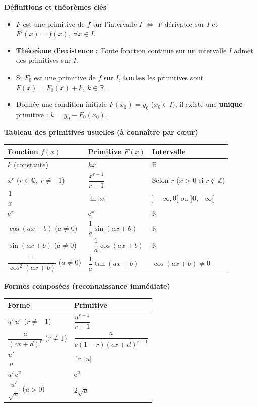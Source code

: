 \documentclass[11pt]{article}
\newcommand{\cle}[1]{{\popxbold\color{popdark}#1}}
\begin{document}
\begin{bilan}

\textbf{Définitions et théorèmes clés}
\begin{itemize}
  \item $F$ est une \cle{primitive} de $f$ sur l'intervalle $I$ $\iff$ $F$ dérivable sur $I$ et $F'(x)=f(x),\ \forall x\in I$.
  \item \textbf{Théorème d'existence :} Toute fonction \cle{continue} sur un intervalle $I$ admet des primitives sur $I$.
  \item Si $F_0$ est une primitive de $f$ sur $I$, \textbf{toutes} les primitives sont $F(x) = F_0(x) + k,\ k\in\mathbb{R}$.
  \item Donnée une condition initiale $F(x_0)=y_0$ ($x_0\in I$), il existe une \textbf{unique} primitive : $k = y_0 - F_0(x_0)$.
\end{itemize}

\textbf{Tableau des primitives usuelles (à connaître par cœur)}
\begin{center}
\begin{tabularx}{\linewidth}{|l|X|l|}\hline
\rowcolor{popblue!40} \textbf{Fonction $f(x)$} & \textbf{Primitive $F(x)$} & \textbf{Intervalle} \\ \hline
$k$ (constante) & $kx$ & $\mathbb{R}$ \\ \hline
$x^r$ \quad ($r\in\mathbb{Q},\ r\neq -1$) & $\dfrac{x^{r+1}}{r+1}$ & Selon $r$ ($x>0$ si $r\notin\mathbb{Z}$) \\ \hline
$\dfrac{1}{x}$ & $\ln|x|$ & $]-\infty,0[$ ou $]0,+\infty[$ \\ \hline
$\mathrm{e}^{x}$ & $\mathrm{e}^{x}$ & $\mathbb{R}$ \\ \hline
$\cos(ax+b)$ \quad ($a\neq 0$) & $\dfrac{1}{a}\sin(ax+b)$ & $\mathbb{R}$ \\ \hline
$\sin(ax+b)$ \quad ($a\neq 0$) & $-\dfrac{1}{a}\cos(ax+b)$ & $\mathbb{R}$ \\ \hline
$\dfrac{1}{\cos^2(ax+b)}$ \quad ($a\neq 0$) & $\dfrac{1}{a}\tan(ax+b)$ & $\cos(ax+b)\neq 0$ \\ \hline
\end{tabularx}
\end{center}

\textbf{Formes composées (reconnaissance immédiate)}
\begin{center}
\begin{tabularx}{\linewidth}{|X|X|}\hline
\rowcolor{popgreen!40} \textbf{Forme} & \textbf{Primitive} \\ \hline
$u'\,u^{r}$ \quad ($r\neq -1$) & $\dfrac{u^{r+1}}{r+1}$ \\ \hline
$\dfrac{a}{(cx+d)^r}$ \quad ($r\neq 1$) & $\dfrac{a}{c(1-r)(cx+d)^{r-1}}$ \\ \hline
$\dfrac{u'}{u}$ & $\ln|u|$ \\ \hline
$u'\,\mathrm{e}^{u}$ & $\mathrm{e}^{u}$ \\ \hline
$\dfrac{u'}{\sqrt{u}}$ \quad ($u>0$) & $2\sqrt{u}$ \\ \hline
\end{tabularx}
\end{center}


\end{bilan}
\end{document}
